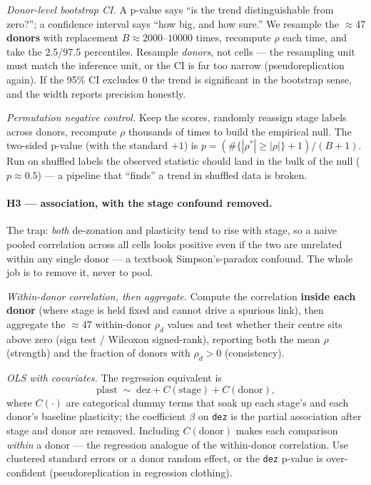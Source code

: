 \documentclass[11pt]{article}
\newcommand{\code}[1]{\texttt{#1}}
\begin{document}
\emph{Donor-level bootstrap CI.} A p-value says ``is the trend distinguishable from zero?''; a
confidence interval says ``how big, and how sure.'' We resample the $\approx$47 \textbf{donors} with
replacement $B\approx2000$--$10000$ times, recompute $\rho$ each time, and take the 2.5/97.5 percentiles.
Resample \emph{donors}, not cells --- the resampling unit must match the inference unit, or the CI is
far too narrow (pseudoreplication again). If the 95\% CI excludes 0 the trend is significant in the
bootstrap sense, and the width reports precision honestly.

\emph{Permutation negative control.} Keep the scores, randomly reassign stage labels across donors,
recompute $\rho$ thousands of times to build the empirical null. The two-sided p-value (with the
standard $+1$) is $p=(\#\{|\rho^\ast|\ge|\rho|\}+1)/(B+1)$. Run on shuffled labels the observed
statistic should land in the bulk of the null ($p\approx0.5$) --- a pipeline that ``finds'' a trend in
shuffled data is broken.

\paragraph{H3 --- association, with the stage confound removed.} The trap: \emph{both} de-zonation and
plasticity tend to rise with stage, so a naive pooled correlation across all cells looks positive even
if the two are unrelated within any single donor --- a textbook Simpson's-paradox confound. The whole
job is to remove it, never to pool.

\emph{Within-donor correlation, then aggregate.} Compute the correlation \textbf{inside each donor}
(where stage is held fixed and cannot drive a spurious link), then aggregate the $\approx$47
within-donor $\rho_d$ values and test whether their centre sits above zero (sign test / Wilcoxon
signed-rank), reporting both the mean $\rho$ (strength) and the fraction of donors with $\rho_d>0$
(consistency).

\emph{OLS with covariates.} The regression equivalent is
\begin{equation}
\text{plast} \;\sim\; \text{dez} + C(\text{stage}) + C(\text{donor}),
\end{equation}
where $C(\cdot)$ are categorical dummy terms that soak up each stage's and each donor's baseline
plasticity; the coefficient $\beta$ on \code{dez} is the partial association after stage and donor are
removed. Including $C(\text{donor})$ makes each comparison \emph{within} a donor --- the regression
analogue of the within-donor correlation. Use clustered standard errors or a donor random effect, or the
\code{dez} p-value is over-confident (pseudoreplication in regression clothing).
\end{document}

